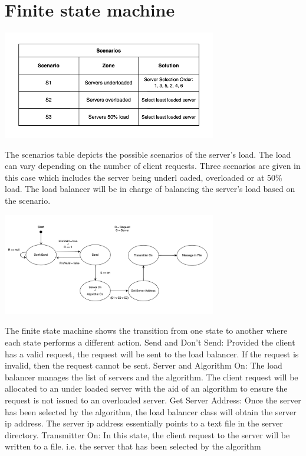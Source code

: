\documentclass{article}
\begin{document}
\section{Finite state machine}
\includegraphics[width=0.7\textwidth,center]{scenarios.png}

The scenarios table depicts the possible scenarios of the server’s load. The load can vary depending on the number of client requests. Three scenarios are given in this case which includes the server being underl oaded, overloaded or at 50\% load. The load balancer will be in charge of balancing the server’s load based on the scenario. 

\includegraphics[width=0.7\textwidth,center]{finite-state-machine.png}

The finite state machine shows the transition from one state to another where each state performs a different action. 
Send and Don’t Send: Provided the client has a valid request, the request will be sent to the load balancer. If the request is invalid, then the request cannot be sent. 
Server and Algorithm On: The load balancer manages the list of servers and the algorithm. The client request will be allocated to an under loaded server with the aid of an algorithm to ensure the request is not issued to an overloaded server. 
Get Server Address: Once the server has been selected by the algorithm, the load balancer class will obtain the server ip address. The server ip address essentially points to a text file in the server directory. 
Transmitter On: In this state, the client request to the server will be written to a file. i.e. the server that has been selected by the algorithm
\end{document}
